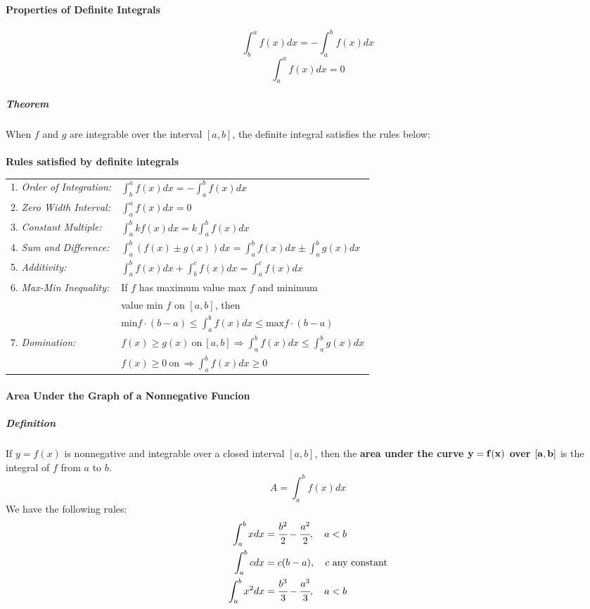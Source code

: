 \documentclass{article}
\begin{document}
            \paragraph{Properties of Definite Integrals}
                \[\int_b^af(x)dx=-\int_a^bf(x)dx\]
                \[\int_a^af(x)dx=0\]
                \subparagraph{Theorem} When $f$ and $g$ are integrable over the interval $[a,b]$, the definite integral satisfies the rules below:\\\\
                \textbf{Rules satisfied by definite integrals}\\
                \begin{tabular}{|ll|}
                    \hline
                    1. \textit{Order of Integration:}&$\int_b^af(x)dx=-\int_a^bf(x)dx$\\
                    2. \textit{Zero Width Interval:}&$\int_a^af(x)dx=0$\\
                    3. \textit{Constant Multiple:}&$\int_a^bkf(x)dx=k\int_a^bf(x)dx$\\
                    4. \textit{Sum and Difference:}&$\int_a^b(f(x)\pm g(x))dx=\int_a^bf(x)dx\pm \int_a^bg(x)dx$\\
                    5. \textit{Additivity:}&$\int_a^bf(x)dx+\int_b^cf(x)dx=\int_a^cf(x)dx$\\
                    6. \textit{Max-Min Inequality:}&If $f$ has maximum value max $f$ and minimum\\& value min $f$ on $[a,b]$, then\\&$\text{min}f\cdot(b-a)\le \int_a^bf(x)dx\le \text{max}f\cdot(b-a)$\\
                    7. \textit{Domination:}&$f(x)\ge g(x)\ \text{on}\ [a,b] \Rightarrow \int_a^bf(x)dx\le \int_a^b g(x)dx$\\&$f(x)\ge 0\ \text{on}\ \Rightarrow\int_a^bf(x)dx\ge 0$\\
                    \hline
                \end{tabular}
            \paragraph{Area Under the Graph of a Nonnegative Funcion}
                \subparagraph{Definition} If $y=f(x)$ is nonnegative and integrable over a closed interval $[a,b]$, then the \textbf{area under the curve $\bf{y=f(x)}$ over $\bf{[a,b]}$} is the integral of $f$ from $a$ to $b$.
                \[A=\int_a^bf(x)dx\]
                We have the following rules:
                \begin{equation}
                    \begin{aligned}
                        \int_a^bxdx&=\cfrac{b^2}{2}-\cfrac{a^2}{2},\quad a<b\\
                        \int_a^bcdx &=c(b-a),\quad c\text{ any constant}\\
                        \int_a^bx^2dx&=\cfrac{b^3}{3}-\cfrac{a^3}{3},\quad a<b\\
                    \end{aligned}
                \end{equation}
\end{document}
